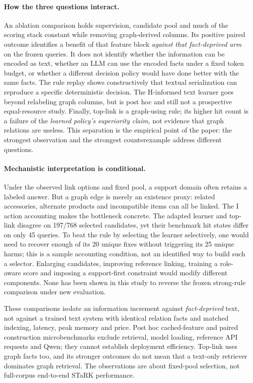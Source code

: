 \documentclass{article}
\begin{document}
\paragraph{How the three questions interact.}
An ablation comparison holds supervision, candidate pool and much of the
scoring stack constant while removing graph-derived columns. Its positive
paired outcome identifies a benefit of that feature block \emph{against
that fact-deprived arm} on the frozen queries. It does not identify
whether the information can be encoded as text, whether an LLM can use
the encoded facts under a fixed token budget, or whether a different
decision policy would have done better with the same facts. The rule
replay shows constructively that textual serialization can reproduce a
specific deterministic decision. The H-informed text learner goes beyond
relabeling graph columns, but is post hoc and still not a prospective
equal-resource study. Finally, top-link is a graph-using rule; its higher
hit count is a failure of the \emph{learned policy's superiority claim},
not evidence that graph relations are useless. This separation is the
empirical point of the paper: the strongest observation and the strongest
counterexample address different questions.

\paragraph{Mechanistic interpretation is conditional.}
Under the observed link options and fixed pool, a support domain often
retains a labeled answer. But a graph edge is merely an existence proxy:
related accessories, alternate products and incompatible items can all
be linked. The I action accounting makes the bottleneck concrete. The
adapted learner and top-link disagree on 197/768 selected candidates,
yet their benchmark hit states differ on only 45 queries. To beat the
rule by selecting the learner selectively, one would need to recover
enough of its 20 unique fixes without triggering its 25 unique harms;
this is a sample accounting condition, not an identified way to build
such a selector. Enlarging candidates, improving reference linking,
training a role-aware score and imposing a support-first constraint
would modify different components. None has been shown in this study
to reverse the frozen strong-rule comparison under new evaluation.

These comparisons isolate an information increment against \emph{fact-deprived}
text, not against a trained text system with identical relation facts and
matched indexing, latency, peak memory and price. Post hoc cached-feature
and paired construction microbenchmarks exclude retrieval, model loading,
reference API requests and Qwen; they cannot establish deployment efficiency.
Top-link uses graph facts too, and its stronger outcomes do not mean that a
text-only retriever dominates graph retrieval. The observations are about
fixed-pool selection, not full-corpus end-to-end STaRK performance.
\end{document}
